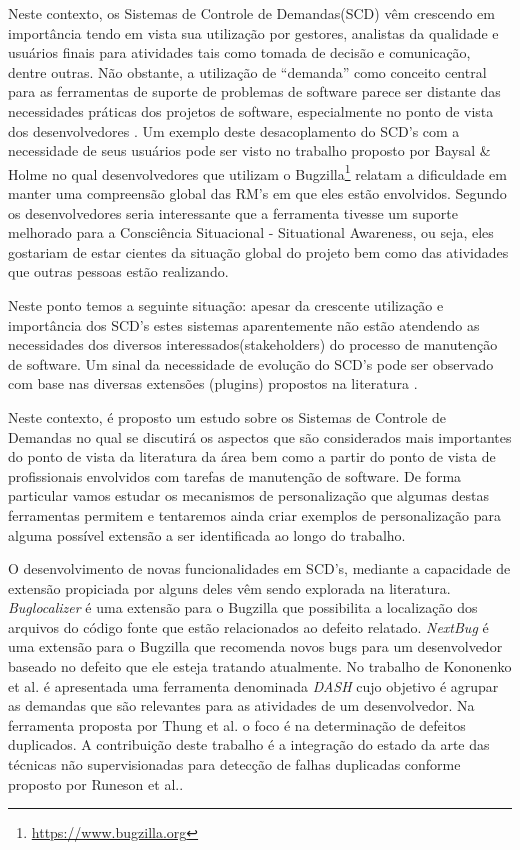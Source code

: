 \documentclass[12pt]{article}
\begin{document}
Neste contexto, os Sistemas de Controle de Demandas(SCD) vêm crescendo em importância tendo em vista sua utilização por gestores, analistas da qualidade e usuários finais para atividades tais como tomada de decisão e comunicação, dentre outras. Não obstante, a utilização de  ``demanda'' como conceito central para as ferramentas de suporte de problemas de software parece ser distante das necessidades práticas dos projetos de software, especialmente no ponto de vista dos desenvolvedores \cite{Baysal:2013:SAP:2486788.2486957}. Um exemplo deste desacoplamento do SCD's com a necessidade de seus usuários pode ser visto no trabalho proposto por Baysal \& Holme \cite{baysal2012qualitative} no qual desenvolvedores que utilizam o Bugzilla\footnote{\url{https://www.bugzilla.org}} relatam a dificuldade em manter uma compreensão global das RM's em que eles estão envolvidos. Segundo os desenvolvedores seria interessante que a ferramenta
tivesse um suporte melhorado para a Consciência Situacional - Situational Awareness, ou seja, eles gostariam de estar cientes da situação global do projeto bem como das atividades que outras pessoas estão realizando. 

Neste ponto temos a seguinte situação: apesar da crescente utilização e importância dos SCD's estes sistemas aparentemente não estão atendendo as necessidades dos diversos interessados(stakeholders) do processo de manutenção de software. Um sinal da necessidade de evolução do SCD's pode ser observado com base nas diversas extensões (plugins) propostos na literatura \cite{101186,Thung:2014:BIT:2635868.2661678,Kononenko:2014:DED:2591062.2591075}. 

Neste contexto, é proposto um estudo sobre os Sistemas de Controle de Demandas no qual se discutirá os aspectos que são considerados mais importantes do ponto de vista da literatura da área bem como
a partir do ponto de vista de profissionais envolvidos com tarefas de manutenção de software. De forma particular vamos estudar os mecanismos de personalização que algumas destas ferramentas permitem e tentaremos ainda criar exemplos de personalização para alguma possível extensão a ser identificada ao longo do trabalho.

O desenvolvimento de novas funcionalidades em SCD's, mediante a capacidade de
extensão propiciada por alguns deles vêm sendo explorada na
literatura. \textit{Buglocalizer} \cite{Thung:2014:BIT:2635868.2661678} é uma
extensão para o Bugzilla que possibilita a localização dos arquivos do código fonte que estão relacionados ao defeito relatado. \textit{NextBug} \cite{101186} é uma extensão para o Bugzilla que
recomenda novos bugs para um desenvolvedor baseado no defeito que ele esteja
tratando atualmente. No trabalho de Kononenko et al. \cite{Kononenko:2014:DED:2591062.2591075} é
apresentada uma ferramenta denominada \textit{DASH} cujo objetivo é agrupar as
demandas que são relevantes para as atividades de um desenvolvedor. Na ferramenta proposta por Thung et al. \cite{Thung:2014:DIT:2642937.2648627} o foco é na determinação de defeitos duplicados. A contribuição deste trabalho é a integração do estado da arte das técnicas não supervisionadas para detecção de
falhas duplicadas conforme proposto por Runeson et al.\cite{Runeson:2007:DDD:1248820.1248882}.
\end{document}
